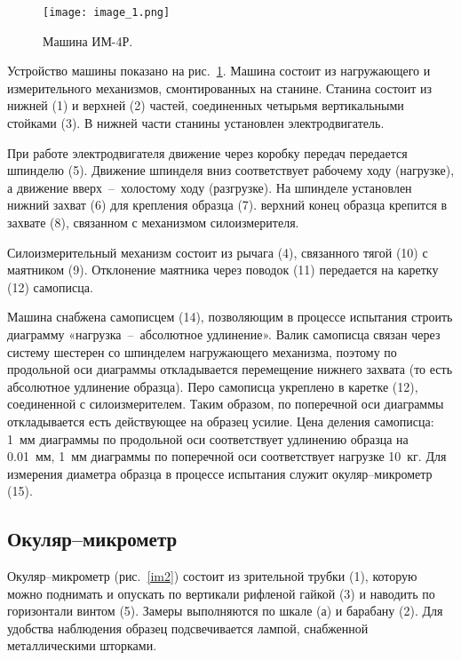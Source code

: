 \documentclass[12pt, a4paper]{article}
\begin{document}
    \begin{figure}[h]
        \centering
        \texttt{[image: image\_1.png]}
        \caption{Машина ИМ-4Р.}
        \label{im1}
    \end{figure}
    
    Устройство машины показано на рис.~\ref{im1}. Машина состоит из нагружающего и измерительного механизмов, смонтированных на станине. Станина состоит из нижней (1) и верхней (2) частей, соединенных четырьмя вертикальными стойками (3). В нижней части станины установлен электродвигатель.
    
    При работе электродвигателя движение через коробку передач передается шпинделю (5). Движение шпинделя вниз соответствует рабочему ходу (нагрузке), а движение вверх~--~холостому ходу (разгрузке). На шпинделе установлен нижний захват (6) для крепления образца (7). верхний конец образца крепится в захвате (8), связанном с механизмом силоизмерителя.
    
    Силоизмерительный механизм состоит из рычага (4), связанного тягой (10) с маятником (9). Отклонение маятника через поводок (11) передается на каретку (12) самописца.
    
    Машина снабжена самописцем (14), позволяющим в процессе испытания строить диаграмму «нагрузка~--~абсолютное удлинение». Валик самописца связан через систему шестерен со шпинделем нагружающего механизма, поэтому по продольной оси диаграммы откладывается перемещение нижнего захвата (то есть абсолютное удлинение образца). Перо самописца укреплено в каретке (12), соединенной с силоизмерителем. Таким образом, по поперечной оси диаграммы откладывается есть действующее на образец усилие. Цена деления самописца: 1~мм диаграммы по продольной оси соответствует удлинению образца на 0.01~мм, 1~мм диаграммы по поперечной оси соответствует нагрузке 10~кг. Для измерения диаметра образца в процессе испытания служит окуляр–микрометр (15).
    
    \subsection{Окуляр–микрометр}
    
    Окуляр–микрометр (рис.~\ref{im2}) состоит из зрительной трубки (1), которую можно поднимать и опускать по вертикали рифленой гайкой (3) и наводить по горизонтали винтом (5). Замеры выполняются по шкале (а) и барабану (2). Для удобства наблюдения образец подсвечивается лампой, снабженной металлическими шторками.
    
\end{document}
